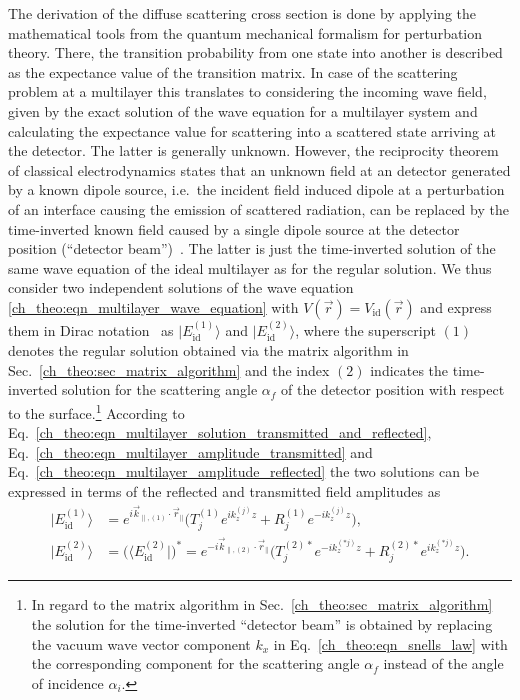 The derivation of the diffuse scattering cross section is done by applying the mathematical tools from the quantum mechanical formalism for perturbation theory. There, the transition probability from one state into another is described as the expectance value of the transition matrix. In case of the scattering problem at a multilayer this translates to considering the incoming wave field, given by the exact solution of the wave equation for a multilayer system and calculating the expectance value for scattering into a scattered state arriving at the detector. The latter is generally unknown. However, the reciprocity theorem~\cite{lorentz_theorem_1896, l._d._landau_electrodynamics_1960} of classical electrodynamics states that an unknown field at an detector generated by a known dipole source, i.e.~the incident field induced dipole at a perturbation of an interface causing the emission of scattered radiation, can be replaced by the time-inverted known field caused by a single dipole source at the detector position (``detector beam'')~\cite{sinha_x-ray_1988, holy_nonspecular_1994, daillant_diffuse_2009}. The latter is just the time-inverted solution of the same wave equation of the ideal multilayer as for the regular solution. We thus consider two independent solutions of the wave equation \eqref{ch_theo:eqn_multilayer_wave_equation} with $V(\vec{r}) = V_\text{id}(\vec{r})$ and express them in Dirac notation~\cite{dirac_new_1939} as $|E_{\text{id}}^{(1)}\rangle$ and $|E_{\text{id}}^{(2)}\rangle$, where the superscript $(1)$ denotes the regular solution obtained via the matrix algorithm in Sec.~\ref{ch_theo:sec_matrix_algorithm} and the index $(2)$ indicates the time-inverted solution for the scattering angle $\alpha_f$ of the detector position with respect to the surface.\footnote{In regard to the matrix algorithm in Sec.~\ref{ch_theo:sec_matrix_algorithm} the solution for the time-inverted ``detector beam'' is obtained by replacing the vacuum wave vector component $k_x$ in Eq.~\eqref{ch_theo:eqn_snells_law} with the corresponding component for the scattering angle $\alpha_f$ instead of the angle of incidence $\alpha_i$.} According to Eq.~\eqref{ch_theo:eqn_multilayer_solution_transmitted_and_reflected}, Eq.~\eqref{ch_theo:eqn_multilayer_amplitude_transmitted} and Eq.~\eqref{ch_theo:eqn_multilayer_amplitude_reflected} the two solutions can be expressed in terms of the reflected and transmitted field amplitudes as
\begin{align}
|E_{\text{id}}^{(1)}\rangle &= e^{i \vec{k}_{\parallel,(1)} \cdot \vec{r}_\parallel} \big(T_{j}^{(1)} e^{i k_z^{(j)} z} + R_{j}^{(1)} e^{-i k_z^{(j)} z}\big) \text{,} \label{ch_theo:eqn_regular_solution_ket}\\
|E_{\text{id}}^{(2)}\rangle &= \big(\langle E_{\text{id}}^{(2)}|\big)^* = e^{-i \vec{k}_{\parallel,(2)} \cdot \vec{r}_\parallel} \big(T_{j}^{(2)*} e^{-i k_z^{(*j)} z} + R_{j}^{(2)*} e^{i k_z^{(*j)} z}\big) \label{ch_theo:eqn_time_inverted_solution_ket} \text{.} 
\end{align}
